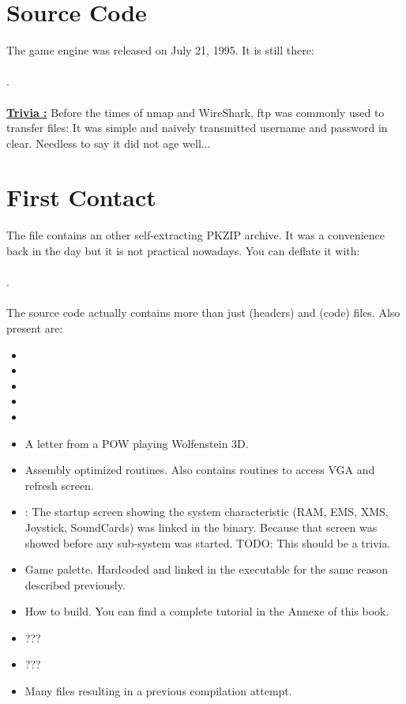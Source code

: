 \documentclass[book.tex]{subfiles}
\begin{document}
\section{Source Code}
The game engine was released on July 21, 1995. It is still there:\\ 
\\.\\
\\
\textbf{\underline{Trivia :}} Before the times of nmap and WireShark, ftp was commonly used to transfer files: It was simple and naively transmitted username and password in clear. Needless to say it did not age well...\\

\section{First Contact}
The file  contains an other self-extracting PKZIP archive. It was a convenience back in the day but it is not practical nowadays. You can deflate it with:\\
\\.\\
\\The source code actually contains more than just  (headers) and  (code) files. Also present are:
\begin{itemize}
\item {}
\item {}
\item {}
\item {}
\item {}
\item {} A letter from a POW playing Wolfenstein 3D.
\item {} Assembly optimized routines. Also contains  routines to access VGA and refresh screen.
\item {}: The startup screen showing the system characteristic (RAM, EMS, XMS, Joystick, SoundCards) was linked in the binary. Because that screen was showed before any sub-system was started. TODO: This should be a trivia.
\item {} Game palette. Hardcoded and linked in the executable for the same reason described previously.
\item {} How to build. You can find a complete tutorial in the Annexe of this book.
\item {} ???
\item {} ???
\item Many files resulting in a previous compilation attempt.
\end{itemize}
\end{document}
